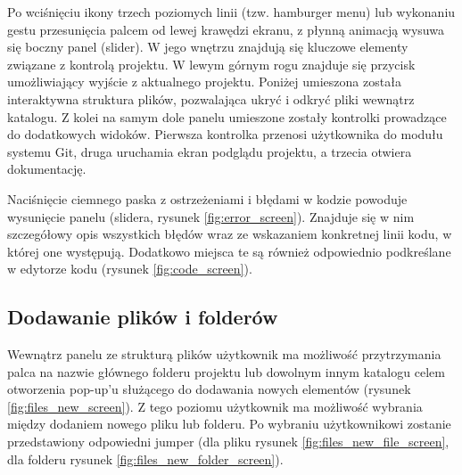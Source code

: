 Po wciśnięciu ikony trzech poziomych linii (tzw. hamburger menu) lub wykonaniu gestu przesunięcia palcem od lewej krawędzi ekranu, z płynną animacją wysuwa się boczny panel (slider). W jego wnętrzu znajdują się kluczowe elementy związane z kontrolą projektu.
\newline\newline
W lewym górnym rogu znajduje się przycisk umożliwiający wyjście z aktualnego projektu. Poniżej umieszona została interaktywna struktura plików, pozwalająca ukryć i odkryć pliki wewnątrz katalogu. Z kolei na samym dole panelu umieszone zostały kontrolki prowadzące do dodatkowych widoków. Pierwsza kontrolka przenosi użytkownika do modułu systemu Git, druga uruchamia ekran podglądu projektu, a trzecia otwiera dokumentację.

Naciśnięcie ciemnego paska z ostrzeżeniami i błędami w kodzie powoduje wysunięcie panelu (slidera, rysunek \ref{fig:error_screen}). Znajduje się w nim szczegółowy opis wszystkich błędów wraz ze wskazaniem konkretnej linii kodu, w której one występują. Dodatkowo miejsca te są również odpowiednio podkreślane w edytorze kodu (rysunek \ref{fig:code_screen}).

\subsection{Dodawanie plików i folderów}
Wewnątrz panelu ze strukturą plików użytkownik ma możliwość przytrzymania palca na nazwie głównego folderu projektu lub dowolnym innym katalogu celem otworzenia pop-up'u służącego do dodawania nowych elementów (rysunek \ref{fig:files_new_screen}). Z tego poziomu użytkownik ma możliwość wybrania między dodaniem nowego pliku lub folderu. Po wybraniu użytkownikowi zostanie przedstawiony odpowiedni jumper (dla pliku rysunek \ref{fig:files_new_file_screen}, dla folderu rysunek \ref{fig:files_new_folder_screen}).




